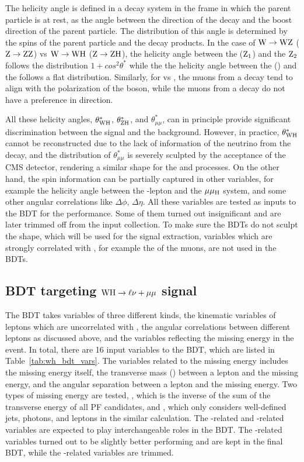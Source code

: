 The helicity angle is defined in a decay system in the frame in which the parent particle is at rest,
as the angle between the direction of the decay and the boost direction of the parent particle.
The distribution of this angle is determined by the spins of the parent particle and the decay products.
In the case of $\mathrm{W} \to \mathrm{W}\mathrm{Z}$ ($\mathrm{Z} \to \mathrm{Z}\mathrm{Z}$) vs $\mathrm{W} \to \mathrm{W}\mathrm{H}$ ($\mathrm{Z} \to \mathrm{Z}\mathrm{H}$), the helicity angle between the \PW ($\mathrm{Z}_{1}$) and the $\mathrm{Z}_{2}$ follows the distribution $1 + cos^{2}\theta^{*}$ %
while the the helicity angle between the \PW (\PZ) and the \PH follows a flat distribution.
Similarly, for \zmm vs \hmm, the muons from a \PZ decay tend to align with the polarization of the \PZ boson, 
while the muons from a \PH decay do not have a preference in direction.

All these helicity angles, $\theta^{*}_{\mathrm{W}\mathrm{H}}$, $\theta^{*}_{\mathrm{Z}\mathrm{H}}$, and $\theta^{*}_{\mu\mu}$, 
can in principle provide significant discrimination between the signal and the background.
However, in practice, $\theta^{*}_{\mathrm{W}\mathrm{H}}$ cannot be reconstructed due to the lack of information of the neutrino from the \PW decay, 
and the distribution of $\theta^{*}_{\mu\mu}$ is severely sculpted by the acceptance of the CMS detector, 
rendering a similar shape for the \zmm and \hmm processes.
On the other hand, the spin information can be partially captured in other variables, 
for example the helicity angle between the \PW-lepton and the $\mu\mu_{\mathrm{H}}$ system, 
and some other angular correlations like $\Delta\phi$, $\Delta\eta$.
All these variables are tested as inputs to the BDT for the performance.
Some of them turned out insignificant and are later trimmed off from the input collection.
To make sure the BDTs do not sculpt the \mmm shape, which will be used for the signal extraction,
variables which are strongly correlated with \mmm, for example the \pt of the muons, are not used in the BDTs.  


\subsection{BDT targeting \texorpdfstring{$\mathrm{W}\mathrm{H} \to \ell\nu+\mu\mu$}{WH to 3l} signal}\label{subsec:WHlep_BDT}

The \WH BDT takes variables of three different kinds, the kinematic variables of leptons which are uncorrelated with \mmm,
the angular correlations between different leptons as discussed above, and the variables reflecting the missing energy in the event.
In total, there are 16 input variables to the BDT, which are listed in Table~\ref{tab:wh_bdt_vars}. 
The variables related to the missing energy includes the missing energy itself, 
the transverse mass (\MT) between a lepton and the missing energy, and the angular separation between a lepton and the missing energy.
Two types of missing energy are tested, \MET, which is the inverse of the sum of the transverse energy of all PF candidates, 
and \MHT, which only considers well-defined jets, photons, and leptons in the similar calculation.
The \MET-related and \MHT-related variables are expected to play interchangeable roles in the BDT.
The \MHT-related variables turned out to be slightly better performing and are kept in the final BDT,
while the \MET-related variables are trimmed.

